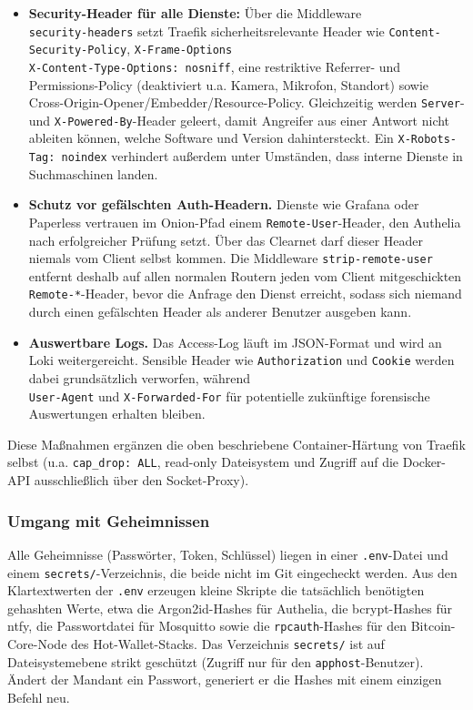 \begin{itemize}
  \item \textbf{Security-Header für alle Dienste:} Über die Middleware\\
    \texttt{security-headers} setzt Traefik sicherheitsrelevante Header wie
    \texttt{Content-Security-Policy}, \texttt{X-Frame-Options} \\
    \texttt{X-Content-Type-Options: nosniff}, eine restriktive Referrer- und
    Permissions-Policy (deaktiviert u.a. Kamera, Mikrofon, Standort) sowie
    Cross-Origin-Opener/Embedder/Resource-Policy. Gleichzeitig werden
    \texttt{Server}- und \texttt{X-Powered-By}-Header geleert, damit
    Angreifer aus einer Antwort nicht ableiten können, welche Software und
    Version dahintersteckt. Ein \texttt{X-Robots-Tag: noindex} verhindert
    außerdem unter Umständen, dass interne Dienste in Suchmaschinen landen.
  \item \textbf{Schutz vor gefälschten Auth-Headern.} Dienste wie Grafana oder
    Paperless vertrauen im Onion-Pfad einem \texttt{Remote-User}-Header, den
    Authelia nach erfolgreicher Prüfung setzt. Über das Clearnet darf dieser
    Header niemals vom Client selbst kommen. Die Middleware
    \texttt{strip-remote-user} entfernt deshalb auf allen normalen Routern
    jeden vom Client mitgeschickten \texttt{Remote-*}-Header, bevor die
    Anfrage den Dienst erreicht, sodass sich niemand durch einen gefälschten
    Header als anderer Benutzer ausgeben kann.
  \item \textbf{Auswertbare Logs.} Das Access-Log läuft im
    \ac{JSON}-Format und wird an Loki weitergereicht. Sensible Header wie
    \texttt{Authorization} und \texttt{Cookie} werden dabei grundsätzlich
    verworfen, während \\
    \texttt{User-Agent} und \texttt{X-Forwarded-For} für
    potentielle zukünftige forensische Auswertungen erhalten bleiben.
\end{itemize}

Diese Maßnahmen ergänzen die oben beschriebene Container-Härtung von Traefik selbst (u.a. \texttt{cap\_drop:
ALL}, read-only Dateisystem und Zugriff auf die Docker-\ac{API} ausschließlich über den Socket-Proxy).


\subsubsection{Umgang mit Geheimnissen}
Alle Geheimnisse (Passwörter, Token, Schlüssel) liegen in einer
\texttt{.env}-Datei und einem \texttt{secrets/}-Verzeichnis, die beide nicht im
Git eingecheckt werden. Aus den Klartextwerten der \texttt{.env} erzeugen kleine
Skripte die tatsächlich benötigten gehashten Werte, etwa die Argon2id-Hashes
für Authelia, die bcrypt-Hashes für ntfy, die Passwortdatei für Mosquitto sowie die \texttt{rpcauth}-Hashes für den Bitcoin-Core-Node des Hot-Wallet-Stacks.
Das Verzeichnis \texttt{secrets/} ist auf Dateisystemebene strikt geschützt
(Zugriff nur für den \texttt{apphost}-Benutzer). Ändert der Mandant ein
Passwort, generiert er die Hashes mit einem einzigen Befehl neu.


